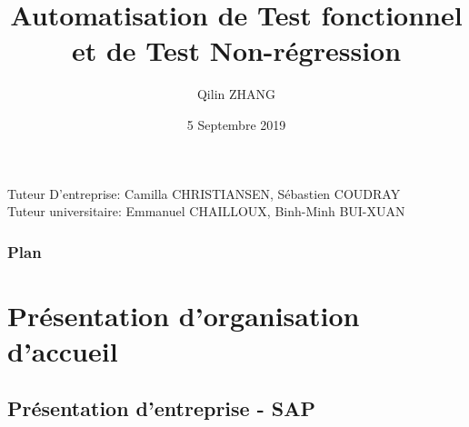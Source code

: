 \documentclass{beamer}
\title[Soutenance de fin d'études]{Automatisation de Test fonctionnel et de Test Non-régression}
\author{Qilin ZHANG}
\institute{Sorbonne Université - Master 2 Informatique STL Alternance}
\date{5 Septembre 2019}
\begin{document}
    \begin{frame}
        
        \titlepage
        \footnotesize Tuteur D'entreprise: Camilla CHRISTIANSEN, Sébastien COUDRAY \\
Tuteur universitaire: Emmanuel CHAILLOUX, Binh-Minh BUI-XUAN
    \end{frame}
    
        
    \begin{frame}
        \frametitle{Plan}
        \tableofcontents
    \end{frame}
    
    \section{Présentation d'organisation d'accueil}
        \subsection{Présentation d'entreprise - SAP}
        
\end{document}
